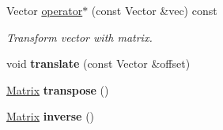\begin{DoxyCompactItemize}
\mbox{\label{class_matrix_ac3260bdf95a729e2aba91688a1e45d1c}} 
Vector \mbox{\hyperlink{class_matrix_ac3260bdf95a729e2aba91688a1e45d1c}{operator$\ast$}} (const Vector \&vec) const
\begin{DoxyCompactList}\small\item\em Transform vector with matrix. \end{DoxyCompactList}\item 
\mbox{\label{class_matrix_a629831a71eb4349905bf6fcad9371219}} 
void {\bfseries translate} (const Vector \&offset)
\item 
\mbox{\label{class_matrix_ae23f817021383e3c8636a714dcba1d21}} 
\mbox{\hyperlink{class_matrix}{Matrix}} {\bfseries transpose} ()
\item 
\mbox{\label{class_matrix_ac4f5e7d4bb1bfd6586bd3384bd2a02b0}} 
\mbox{\hyperlink{class_matrix}{Matrix}} {\bfseries inverse} ()
\end{DoxyCompactItemize}
